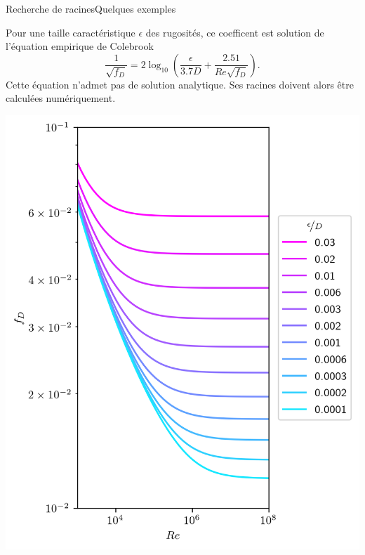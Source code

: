\documentclass[usenames,dvipsnames,svgnames,10pt,aspectratio=169]{beamer}
\begin{document}
\begin{frame}[t, c]{Recherche de racines}{Quelques exemples}
  \begin{minipage}{.68\textwidth}
    Pour une taille caractéristique $\epsilon$ des rugosités, ce coefficent est solution de l'équation empirique de Colebrook
    \[
    \dfrac{1}{\sqrt{f_D}} = 2 \log_{10} \left( \dfrac{\epsilon}{3.7D} + \dfrac{2.51}{Re \sqrt{f_D}} \right).
    \]
    Cette équation n'admet pas de solution analytique.
    Ses racines doivent alors être calculées numériquement.

  \end{minipage}%
  \hfill
  \begin{minipage}{.28\textwidth}
    \centering
    \includegraphics[width=\textwidth]{Moody_chart}
  \end{minipage}

  \vspace{1cm}
\end{frame}
\end{document}
